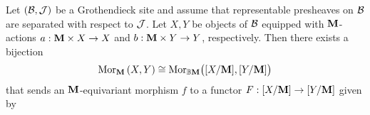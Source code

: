 \begin{theorem}\label{theorem:equivariant_morphisms_can_described_by_fibered_categories}
Let $({\mathcal B},{\mathcal J})$ be a Grothendieck site and assume that representable presheaves on ${\mathcal B}$ are separated with respect to ${\mathcal J}$. Let $X,Y$ be objects of ${\mathcal B}$ equipped with $\mathbf{M}$-actions $a:\mathbf{M}\times X\rightarrow X$ and $b:\mathbf{M}\times Y\rightarrow Y$, respectively. Then there exists a bijection
$$\mathrm{Mor}_{\mathbf{M}}\left(X,Y\right)\cong \mathrm{Mor}_{\mathbb{B}\mathbf{M}}\big([X/\mathbf{M}],[Y/\mathbf{M}]\big)$$
that sends an $\mathbf{M}$-equivariant morphism $f$ to a functor $F:[X/\mathbf{M}]\rightarrow [Y/\mathbf{M}]$ given by
\begin{center}
\end{center}
\end{theorem}
